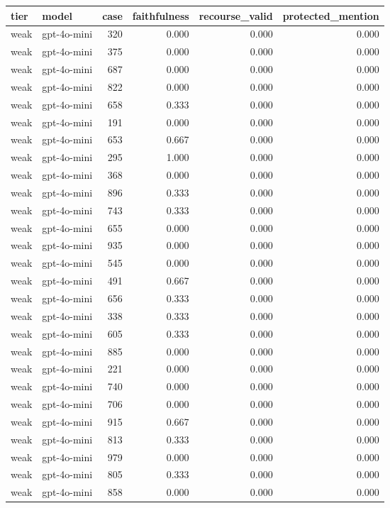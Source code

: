 \begin{tabular}{llrrrr}
\toprule
tier & model & case & faithfulness & recourse_valid & protected_mention \\
\midrule
weak & gpt-4o-mini & 320 & 0.000 & 0.000 & 0.000 \\
weak & gpt-4o-mini & 375 & 0.000 & 0.000 & 0.000 \\
weak & gpt-4o-mini & 687 & 0.000 & 0.000 & 0.000 \\
weak & gpt-4o-mini & 822 & 0.000 & 0.000 & 0.000 \\
weak & gpt-4o-mini & 658 & 0.333 & 0.000 & 0.000 \\
weak & gpt-4o-mini & 191 & 0.000 & 0.000 & 0.000 \\
weak & gpt-4o-mini & 653 & 0.667 & 0.000 & 0.000 \\
weak & gpt-4o-mini & 295 & 1.000 & 0.000 & 0.000 \\
weak & gpt-4o-mini & 368 & 0.000 & 0.000 & 0.000 \\
weak & gpt-4o-mini & 896 & 0.333 & 0.000 & 0.000 \\
weak & gpt-4o-mini & 743 & 0.333 & 0.000 & 0.000 \\
weak & gpt-4o-mini & 655 & 0.000 & 0.000 & 0.000 \\
weak & gpt-4o-mini & 935 & 0.000 & 0.000 & 0.000 \\
weak & gpt-4o-mini & 545 & 0.000 & 0.000 & 0.000 \\
weak & gpt-4o-mini & 491 & 0.667 & 0.000 & 0.000 \\
weak & gpt-4o-mini & 656 & 0.333 & 0.000 & 0.000 \\
weak & gpt-4o-mini & 338 & 0.333 & 0.000 & 0.000 \\
weak & gpt-4o-mini & 605 & 0.333 & 0.000 & 0.000 \\
weak & gpt-4o-mini & 885 & 0.000 & 0.000 & 0.000 \\
weak & gpt-4o-mini & 221 & 0.000 & 0.000 & 0.000 \\
weak & gpt-4o-mini & 740 & 0.000 & 0.000 & 0.000 \\
weak & gpt-4o-mini & 706 & 0.000 & 0.000 & 0.000 \\
weak & gpt-4o-mini & 915 & 0.667 & 0.000 & 0.000 \\
weak & gpt-4o-mini & 813 & 0.333 & 0.000 & 0.000 \\
weak & gpt-4o-mini & 979 & 0.000 & 0.000 & 0.000 \\
weak & gpt-4o-mini & 805 & 0.333 & 0.000 & 0.000 \\
weak & gpt-4o-mini & 858 & 0.000 & 0.000 & 0.000 \\

\end{tabular}
